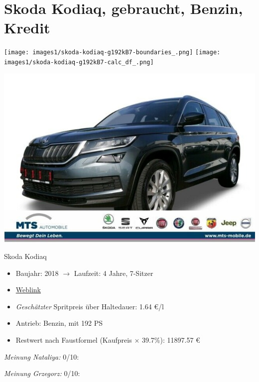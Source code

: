 \documentclass[landscape, DIV=99, 14pt]{scrartcl}
\begin{document}
\pagebreak


\twocolumn

\section*{Skoda Kodiaq, gebraucht, Benzin, Kredit}
\begin{center}
\texttt{[image: images1/skoda-kodiaq-g192kB7-boundaries\_.png]}
\null
\vspace{0.5cm}
\texttt{[image: images1/skoda-kodiaq-g192kB7-calc\_df\_.png]}
\end{center}

\pagebreak
\begin{center}
\includegraphics[width=0.9\columnwidth]{cars/skoda-kodiaq-4x4-2p0-tsi.png}

Skoda Kodiaq
\end{center}

\begin{itemize}
    \item Baujahr: 2018 $\rightarrow$ Laufzeit: 4 Jahre, 7-Sitzer
    \item \href{https://suchen.mobile.de/fahrzeuge/details.html?action=parkItem&id=336255689}{Weblink}
    \item \emph{Gesch\"atzter} Spritpreis \"uber Haltedauer: 1.64 \euro{}/l
    \item Antrieb: Benzin, mit 192 PS
    \item Restwert nach Faustformel (Kaufpreis $\times$ 39.7\%): 11897.57 \euro{}
\end{itemize}

\begin{small}
\emph{Meinung Nataliya:} 0/10: 
        
\emph{Meinung Grzegorz:} 0/10: 
\end{small}
\end{document}
